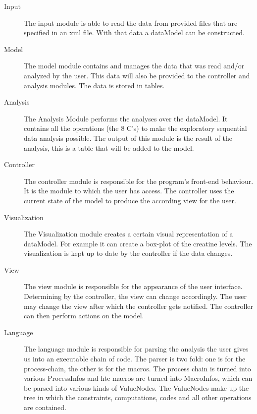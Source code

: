 \documentclass[a4paper]{article}
\begin{document}
\begin{description}
\item[Input]
The input module is able to read the data from provided files that are specified in an xml file. With that data a dataModel can be constructed.
\item[Model]
The model module contains and manages the data that was read and/or analyzed by the user. This data will also be provided to the controller and analysis modules. The data is stored in tables. 
\item[Analysis]
The Analysis Module performs the analyses over the dataModel. It contains all the operations (the 8 C's) to make the exploratory sequential data analysis possible. The output of this module is the result of the analysis, this is a table that will be added to the model.
\item[Controller]
The controller module is responsible for the program's front-end behaviour. It is the module to which the user has access. The controller uses the current state of the model to produce the according view for the user.
\item[Visualization]
The Visualization module creates a certain visual representation of a dataModel. For example it can create a box-plot of the creatine levels. The visualization is kept up to date by the controller if the data changes.
\item[View]
The view module is responsible for the appearance of the user interface. Determining by the controller, the view can change accordingly. The user may change the view after which the controller gets notified. The controller can then perform actions on the model.
\item[Language]
The language module is responsible for parsing the analysis the user gives us into an executable chain of code. The parser is two fold: one is for the process-chain, the other is for the macros. The process chain is turned into various ProcessInfos and hte macros are turned into MacroInfos, which can be parsed into various kinds of ValueNodes. The ValueNodes make up the tree in which the constraints, computations, codes and all other operations are contained.

\end{description}
\end{document}

